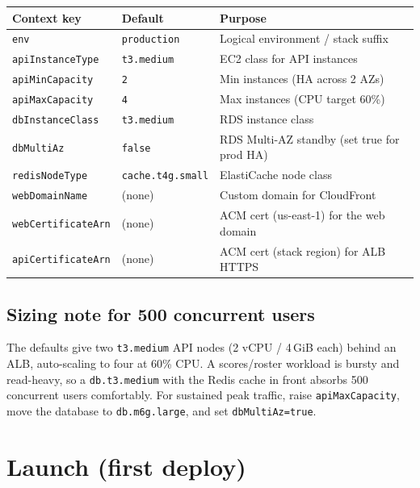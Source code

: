 \documentclass[11pt,a4paper]{article}
\begin{document}
\begin{center}
\begin{longtable}{@{}lll@{}}
\toprule
\textbf{Context key} & \textbf{Default} & \textbf{Purpose} \\
\midrule
\endhead
\texttt{env}               & \texttt{production} & Logical environment / stack suffix \\
\texttt{apiInstanceType}   & \texttt{t3.medium}  & EC2 class for API instances \\
\texttt{apiMinCapacity}    & \texttt{2}          & Min instances (HA across 2 AZs) \\
\texttt{apiMaxCapacity}    & \texttt{4}          & Max instances (CPU target 60\%) \\
\texttt{dbInstanceClass}   & \texttt{t3.medium}  & RDS instance class \\
\texttt{dbMultiAz}         & \texttt{false}      & RDS Multi-AZ standby (set true for prod HA) \\
\texttt{redisNodeType}     & \texttt{cache.t4g.small} & ElastiCache node class \\
\texttt{webDomainName}     & (none)              & Custom domain for CloudFront \\
\texttt{webCertificateArn} & (none)              & ACM cert (us-east-1) for the web domain \\
\texttt{apiCertificateArn} & (none)              & ACM cert (stack region) for ALB HTTPS \\
\bottomrule
\end{longtable}
\end{center}

\subsection{Sizing note for 500 concurrent users}

The defaults give two \texttt{t3.medium} API nodes (2 vCPU / 4\,GiB each) behind
an ALB, auto-scaling to four at 60\% CPU. A scores/roster workload is bursty and
read-heavy, so a \texttt{db.t3.medium} with the Redis cache in front absorbs
500 concurrent users comfortably. For sustained peak traffic, raise
\texttt{apiMaxCapacity}, move the database to \texttt{db.m6g.large}, and set
\texttt{dbMultiAz=true}.

\section{Launch (first deploy)}
\end{document}
